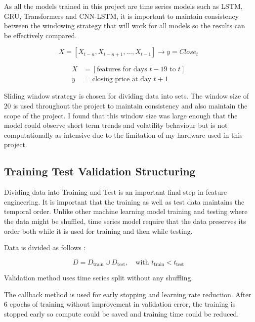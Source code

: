 As all the models trained in this project are time series models such as LSTM, GRU, Transformers and CNN-LSTM, it is important to maintain consistency between the windowing strategy that will work for all models so the results can be effectively compared.

\begin{equation}
X = [X_{t-n}, X_{t-n+1}, ..., X_{t-1}] \rightarrow y = Close_t
\end{equation}

\begin{align*}
    X &= [\text{features for days } t-19 \text{ to } t] \\
    y &= \text{closing price at day } t+1
\end{align*}

Sliding window strategy is chosen for dividing data into sets. The window size of 20 is used throughout the project to maintain consistency and also maintain the scope of the project. I found that this window size was large enough that the model could observe short term trends and volatility behaviour but is not computationally as intensive due to the limitation of my hardware used in this project.

\subsection{Training Test Validation Structuring}

Dividing data into Training and Test is an important final step in feature engineering. It is important that the training as well as test data maintains the temporal order. Unlike other machine learning model training and testing where the data might be shuffled, time series model require that the data preserves its order both while it is used for training and then while testing.

Data is divided as follows :

\begin{equation}
D = D_{\text{train}} \cup D_{\text{test}}, \quad \text{with } t_{\text{train}} < t_{\text{test}}
\end{equation}

Validation method uses time series split without any shuffling.

The callback method is used for early stopping and learning rate reduction. After 6 epochs of training without improvement in validation error, the training is stopped early so compute could be saved and training time could be reduced.

